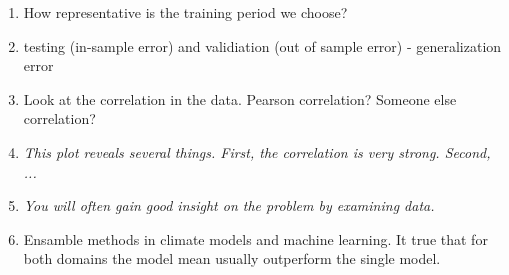 \begin{enumerate}
    \item How representative is the training period we choose?
    \item testing (in-sample error) and validiation (out of sample error) - generalization error 
    \item Look at the correlation in the data. Pearson correlation? Someone else correlation?
    \item \textit{This plot reveals several things. First, the correlation is very strong. Second, ... }
    \item \textit{You will often gain good insight on the problem by examining data.}
    \item Ensamble methods in climate models and machine learning. It true that for both domains the model mean usually outperform the single model.
\end{enumerate}
